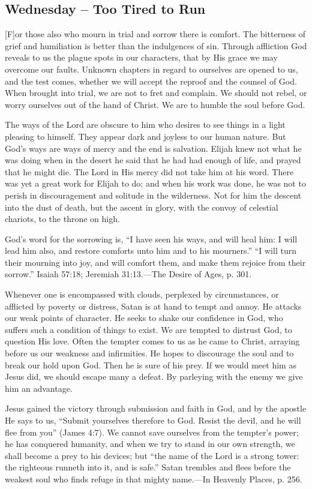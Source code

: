 \documentclass[a4paper, 10pt, twoside, headings=small]{scrartcl}
\begin{document}
\begin{multicols}{2}
\section*{Wednesday – Too Tired to Run}

[F]or those also who mourn in trial and sorrow there is comfort. The bitterness of grief and humiliation is better than the indulgences of sin. Through affliction God reveals to us the plague spots in our characters, that by His grace we may overcome our faults. Unknown chapters in regard to ourselves are opened to us, and the test comes, whether we will accept the reproof and the counsel of God. When brought into trial, we are not to fret and complain. We should not rebel, or worry ourselves out of the hand of Christ. We are to humble the soul before God.

The ways of the Lord are obscure to him who desires to see things in a light pleasing to himself. They appear dark and joyless to our human nature. But God’s ways are ways of mercy and the end is salvation. Elijah knew not what he was doing when in the desert he said that he had had enough of life, and prayed that he might die. The Lord in His mercy did not take him at his word. There was yet a great work for Elijah to do; and when his work was done, he was not to perish in discouragement and solitude in the wilderness. Not for him the descent into the dust of death, but the ascent in glory, with the convoy of celestial chariots, to the throne on high.

God’s word for the sorrowing is, “I have seen his ways, and will heal him: I will lead him also, and restore comforts unto him and to his mourners.” “I will turn their mourning into joy, and will comfort them, and make them rejoice from their sorrow.” Isaiah 57:18; Jeremiah 31:13.—The Desire of Ages, p. 301.

Whenever one is encompassed with clouds, perplexed by circumstances, or afflicted by poverty or distress, Satan is at hand to tempt and annoy. He attacks our weak points of character. He seeks to shake our confidence in God, who suffers such a condition of things to exist. We are tempted to distrust God, to question His love. Often the tempter comes to us as he came to Christ, arraying before us our weakness and infirmities. He hopes to discourage the soul and to break our hold upon God. Then he is sure of his prey. If we would meet him as Jesus did, we should escape many a defeat. By parleying with the enemy we give him an advantage.

Jesus gained the victory through submission and faith in God, and by the apostle He says to us, “Submit yourselves therefore to God. Resist the devil, and he will flee from you” (James 4:7). We cannot save ourselves from the tempter’s power; he has conquered humanity, and when we try to stand in our own strength, we shall become a prey to his devices; but “the name of the Lord is a strong tower: the righteous runneth into it, and is safe.” Satan trembles and flees before the weakest soul who finds refuge in that mighty name.—In Heavenly Places, p. 256.


\end{multicols}
\end{document}
